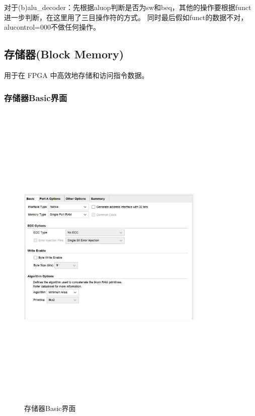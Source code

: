 对于(b)alu\_decoder：先根据aluop判断是否为sw和beq，其他的操作要根据funct进一步判断，在这里用了三目操作符的方式。
同时最后假如funct的数据不对，alucontrol=000不做任何操作。
\subsection{存储器(Block Memory)}\label{sub:ctl}
用于在 FPGA 中高效地存储和访问指令数据。
\subsubsection{存储器Basic界面}
\begin{figure}[htbp]
    \centering
    \includegraphics[width=0.8\textwidth,height=6in,keepaspectratio]{BMG1.jpg}
    \caption{存储器Basic界面}
    \label{image1}
\end{figure}
